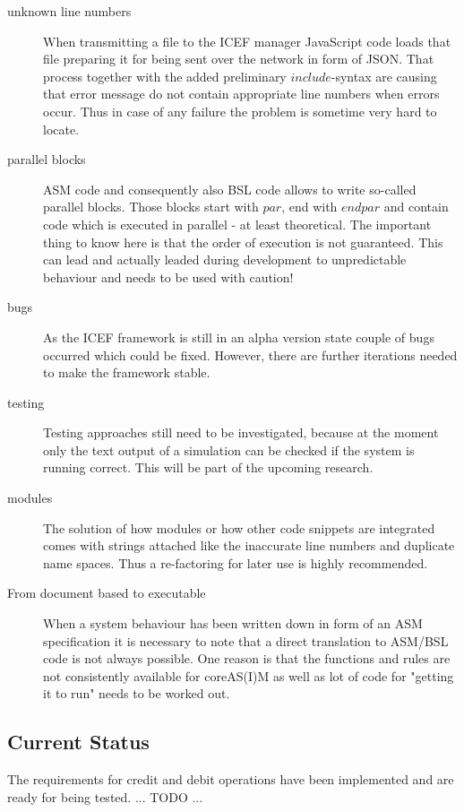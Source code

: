 \begin{description}
	\item[unknown line numbers] When transmitting a file to the ICEF manager JavaScript code loads that file preparing it for being sent over the network in form of JSON. That process together with the added preliminary $include$-syntax are causing that error message do not contain appropriate line numbers when errors occur. Thus in case of any failure the problem is sometime very hard to locate.
	\item[parallel blocks] ASM code and consequently also BSL code allows to write so-called parallel blocks. Those blocks start with $par$, end with $endpar$ and contain code which is executed in parallel - at least theoretical. The important thing to know here is that the order of execution is not guaranteed. This can lead and actually leaded during development to unpredictable behaviour and needs to be used with caution!
	\item[bugs] As the ICEF framework is still in an alpha version state couple of bugs occurred which could be fixed. However, there are further iterations needed to make the framework stable.
	\item[testing] Testing approaches still need to be investigated, because at the moment only the text output of a simulation can be checked if the system is running correct. This will be part of the upcoming research.
	\item[modules] The solution of how modules or how other code snippets are integrated comes with strings attached like the inaccurate line numbers and duplicate name spaces. Thus a re-factoring for later use is highly recommended.
	\item[From document based to executable] When a system behaviour has been written down in form of an ASM specification it is necessary to note that a direct translation to ASM/BSL code is not always possible. One reason is that the functions and rules are not consistently available for coreAS(I)M as well as lot of code for "getting it to run" needs to be worked out.
\end{description}

\subsection{Current Status}

The requirements for credit and debit operations have been implemented and are ready for being tested. ... TODO ...